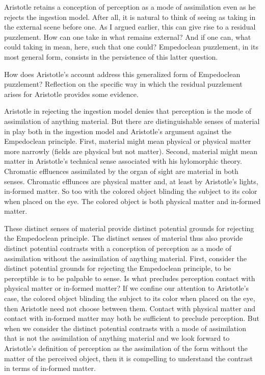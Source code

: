 Aristotle retains a conception of perception as a mode of assimilation even as he rejects the ingestion model. After all, it is natural to think of seeing as taking in the external scene before one. As I argued earlier, this can give rise to a residual puzzlement. How can one take in what remains external? And if one can, what could taking in mean, here, such that one could? Empedoclean puzzlement, in its most general form, consists in the persistence of this latter question.

How does Aristotle's account address this generalized form of Empedoclean puzzlement? Reflection on the specific way in which the residual puzzlement arises for Aristotle provides some evidence.

Aristotle in rejecting the ingestion model denies that perception is the mode of assimilation of anything material. But there are distinguishable senses of material in play both in the ingestion model and Aristotle's argument against the Empedoclean principle. First, material might mean physical or physical matter more narrowly (fields are physical but not matter). Second, material might mean matter in Aristotle's technical sense associated with his hylomorphic theory. Chromatic effluences assimilated by the organ of sight are material in both senses. Chromatic efflunces are physical matter and, at least by Aristotle's lights, in-formed matter. So too with the colored object blinding the subject to its color when placed on the eye. The colored object is both physical matter and in-formed matter. 

These distinct senses of material provide distinct potential grounds for rejecting the Empedoclean principle. The distinct senses of material thus also provide distinct potential contrasts with a conception of perception as a mode of assimilation without the assimilation of anything material. First, consider the distinct potential grounds for rejecting the Empedoclean principle, to be perceptible is to be palpable to sense. Is what precludes perception contact with physical matter or in-formed matter? If we confine our attention to Aristotle's case, the colored object blinding the subject to its color when placed on the eye, then Aristotle need not choose between them. Contact with physical matter and contact with in-formed matter may both be sufficient to preclude perception. But when we consider the distinct potential contrasts with a mode of assimilation that is not the assimilation of anything material and we look forward to Aristotle's definition of perception as the assimilation of the form without the matter of the perceived object, then it is compelling to understand the contrast in terms of in-formed matter. 





